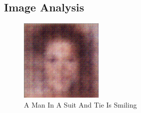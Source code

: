\documentclass{article}%
\begin{document}
%
\subsection{Image Analysis}%
\label{subsec:ImageAnalysis}%


\begin{figure}[h!]%
\centering%
\includegraphics[width=150px]{500_fake_images/samples_5_468.png}%
\caption{A Man In A Suit And Tie Is Smiling}%
\end{figure}

%
\end{document}
